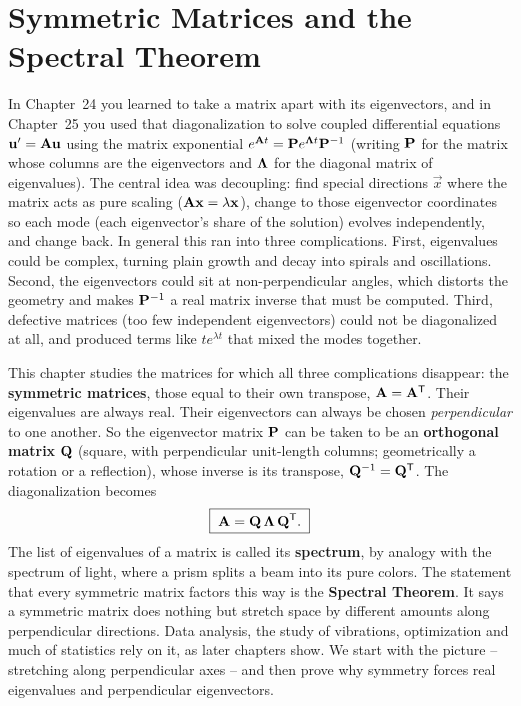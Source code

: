 \chapter{Symmetric Matrices and the Spectral Theorem}

In Chapter~24 you learned to take a matrix apart with its eigenvectors, and in
Chapter~25 you used that diagonalization to solve coupled differential
equations $\mathbf{u}' = \mathbf{A}\mathbf{u}$ using the matrix exponential
$e^{\mathbf{A}t} = \mathbf{P}e^{\mathbf{\Lambda}t}\mathbf{P}^{-1}$ (writing $\mathbf{P}$ for the
matrix whose columns are the eigenvectors and $\mathbf{\Lambda}$ for the diagonal
matrix of eigenvalues). The central idea was
decoupling: find special directions $\vec{x}$ where the matrix acts as pure
scaling ($\mathbf{A}\mathbf{x} = \lambda\mathbf{x}$), change to those eigenvector
coordinates so each mode (each eigenvector's share of the solution) evolves
independently, and change back. In general this ran into three complications.
First, eigenvalues could be complex, turning plain growth and decay into
spirals and oscillations. Second, the eigenvectors could sit at
non-perpendicular angles, which distorts the geometry and makes $\mathbf{P}^{-1}$ a
real matrix inverse that must be computed. Third, defective matrices (too few
independent eigenvectors) could not be diagonalized at all, and produced terms
like $t e^{\lambda t}$ that mixed the modes together.

This chapter studies the matrices for which all three complications
disappear: the \textbf{symmetric matrices}, those equal to their own transpose,
$\mathbf{A} = \mathbf{A}^{\mathsf{T}}$. Their eigenvalues are always real. Their eigenvectors can
always be chosen \emph{perpendicular} to one another. So the eigenvector matrix
$\mathbf{P}$ can be taken to be an \textbf{orthogonal matrix} $\mathbf{Q}$ (square,
with perpendicular unit-length columns; geometrically a rotation or a
reflection), whose inverse is its transpose, $\mathbf{Q}^{-1} = \mathbf{Q}^{\mathsf{T}}$.
The diagonalization becomes
\[
  \boxed{\;\mathbf{A} = \mathbf{Q}\,\mathbf{\Lambda}\,\mathbf{Q}^{\mathsf{T}}.\;}
\]
The list of eigenvalues of a matrix is called its \textbf{spectrum}, by
analogy with the spectrum of light, where a prism splits a beam into its pure
colors. The statement that every symmetric matrix factors this way is the
\textbf{Spectral Theorem}. It says a symmetric matrix does nothing but stretch
space by different amounts along perpendicular directions. Data analysis,
the study of vibrations, optimization and much of statistics rely on it, as
later chapters show. We start with the picture -- stretching along
perpendicular axes -- and then prove why symmetry forces real eigenvalues and
perpendicular eigenvectors.

